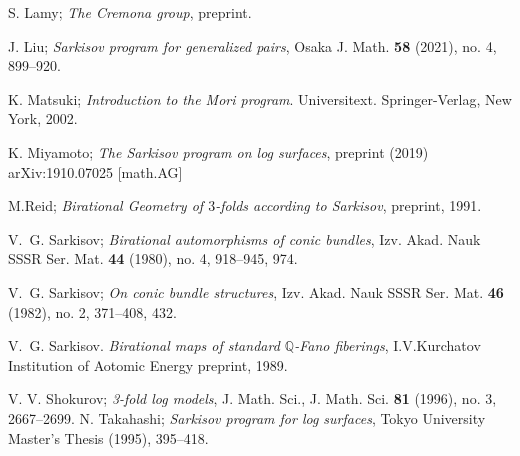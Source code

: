 \documentclass[11pt]{amsart}
\begin{document}
\begin{thebibliography}{99}
   S. Lamy; \textit{The Cremona group}, preprint.

  J. Liu;
  \textit{Sarkisov program for generalized pairs},
  Osaka J. Math. \textbf{58} (2021), no. 4, 899–920.

   K. Matsuki; \textit{Introduction to the Mori program}. Universitext. Springer-Verlag, New York, 2002. 

  K. Miyamoto;
  \textit{The Sarkisov program on log surfaces},
  preprint (2019) arXiv:1910.07025 [math.AG]

  M.Reid;
  \textit{Birational Geometry of $3$-folds according to Sarkisov}, preprint, 1991.

  V.~G. Sarkisov;
  \textit{{Birational automorphisms of conic bundles}},
  Izv. Akad. Nauk SSSR Ser. Mat. \textbf{44} (1980), no. 4, 918–945, 974.

  V.~G. Sarkisov;
  \textit{On conic bundle structures},
  Izv. Akad. Nauk SSSR Ser. Mat. \textbf{46} (1982), no. 2, 371–408, 432.

  V.~G. Sarkisov.
  \textit{Birational maps of standard $\mathbb{Q}$-Fano fiberings},
  I.V.Kurchatov Institution of Aotomic Energy preprint, 1989.

  V. V. Shokurov;
  \textit{3-fold log models}, J. Math. Sci., 
  J. Math. Sci. \textbf{81} (1996), no. 3, 2667–2699.
  N. Takahashi; 
  \textit{Sarkisov program for log surfaces},
  Tokyo University Master's Thesis (1995), 395--418.
\end{thebibliography}
\end{document}
